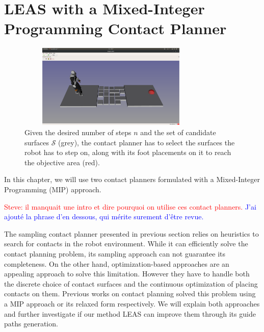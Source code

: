 

\chapter{LEAS with a Mixed-Integer Programming Contact Planner}
\label{sec:CP-SL1M}
\minitoc
\bigskip

\begin{figure}[ht]
    \centering
    \captionsetup[subfigure]{justification=centering}
    \includegraphics[trim={8cm 7cm 7.5cm 9cm},clip,width=0.8\textwidth,height=4cm]{Figures/Chapter_MIP_SL1M/rubbles/rubbles_empty.png}
    \caption{Given the desired number of steps $n$ and the set of candidate surfaces $\mathcal{S}$ (grey), the contact planner has to select the surfaces the robot has to step on, along with its foot placements on it to reach the objective area (red).\label{fig:rubbles:empty}}
\end{figure}

In this chapter, we will use two contact planners formulated with a Mixed-Integer Programming (MIP) approach.

\textcolor{red}{Steve: il manquait une intro et dire pourquoi on utilise ces contact planners.}
\textcolor{blue}{J'ai ajouté la phrase d'en dessous, qui mérite surement d'être revue.}

The sampling contact planner presented in previous section relies on heuristics to search for contacts in the robot environment.
While it can efficiently solve the contact planning problem, its sampling approach can not guarantee its completeness.
On the other hand, optimization-based approaches are an appealing approach to solve this limitation. However they have to handle both the discrete choice of contact surfaces and the continuous optimization of placing contacts on them.
Previous works on contact planning \cite{deits2014FootPlanMI, sl1m_v2} solved this problem using a MIP approach or its relaxed form respectively.
We will explain both approaches and further investigate if our method LEAS can improve them through its guide paths generation.

